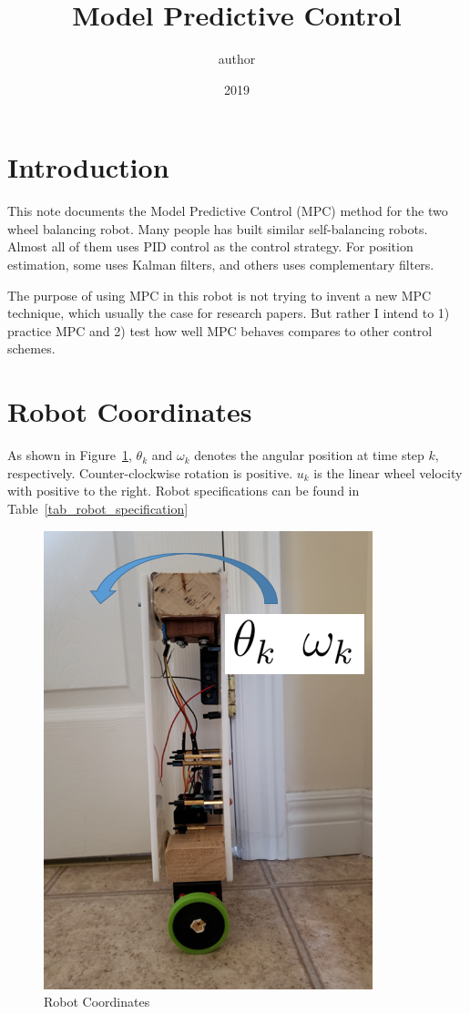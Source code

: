 \documentclass[12pt]{article}
\title{Model Predictive Control}
\date{2019}
\author{author}
\begin{document}
\pagecolor{gray}
\maketitle
\section{Introduction}
This note documents the Model Predictive Control (MPC) method for the two
wheel balancing robot. Many people has built similar self-balancing robots.
Almost all of them uses PID control as the control strategy. For position
estimation, some uses Kalman filters, and others uses complementary filters.

The purpose of using MPC in this robot is not trying to invent a new MPC
technique, which usually the case for research papers.
But rather I intend to 1) practice MPC and 2) test how well MPC behaves
compares to other control schemes.

\section{Robot Coordinates}
As shown in Figure~\ref{fig_coordinates}, $\theta_k$ and $\omega_k$ denotes 
the angular position at time step $k$, respectively.
Counter-clockwise rotation is positive. $u_k$ is the linear wheel velocity
with positive to the right. Robot specifications can be found in 
Table~\ref{tab_robot_specification}


\begin{figure}[h]
  \label{fig_coordinates}
  \centering
  \includegraphics[scale=0.5]{./figures/coordinates.png}
  \caption{Robot Coordinates}
\end{figure}
\end{document}
